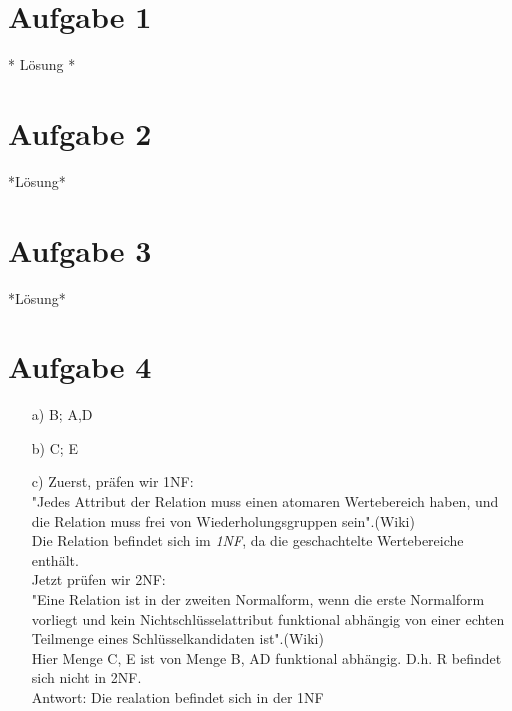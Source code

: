 \documentclass[a4paper,12pt]{scrartcl}
\begin{document}
\section{Aufgabe 1}
* L\"osung *

\section{Aufgabe 2}
*L\"osung*

\section{Aufgabe 3} 	
*L\"osung*

\section{Aufgabe 4} 	
\begin{enumerate}
\item[a)] {B}; {A,D}

\item[b)] {C}; {E}

\item[c)]
Zuerst, präfen wir 1NF:\\
"Jedes Attribut der Relation muss einen atomaren Wertebereich haben, und die Relation muss frei von Wiederholungsgruppen sein".(Wiki)\\
Die Relation befindet sich im {\itshape \large 1NF}, da die geschachtelte Wertebereiche enthält.\\

Jetzt prüfen wir 2NF:\\
"Eine Relation ist in der zweiten Normalform, wenn die erste Normalform vorliegt und kein Nichtschlüsselattribut funktional abhängig von einer echten Teilmenge eines Schlüsselkandidaten ist".(Wiki)\\
Hier Menge {C, E} ist von Menge {B, AD} funktional abhängig. D.h. R befindet sich nicht in 2NF.\\ 
Antwort: Die realation befindet sich in der 1NF

\end{enumerate}
\end{document}
